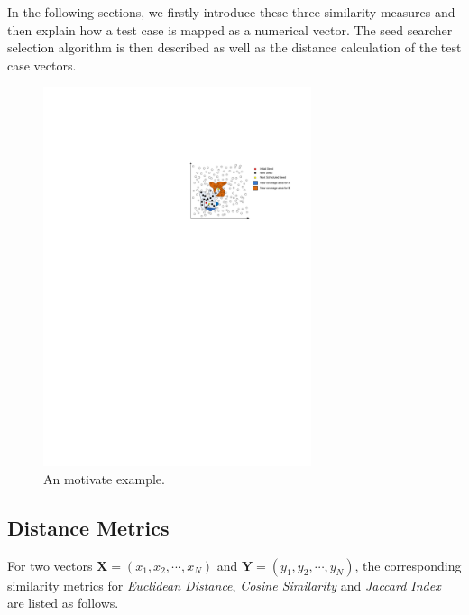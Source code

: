 In the following sections, we firstly introduce these three similarity measures and then explain how a test case is mapped as a numerical vector. The seed searcher selection algorithm is then described as well as the distance calculation of the test case vectors.

\begin{figure}
\centering
\includegraphics[width=0.7\textwidth]{figures/motivate-example.pdf} 
\caption{An motivate example.}\label{motivate-example}
\end{figure}


\subsection{Distance Metrics}
For two vectors $\mathbf{X} = (x_1, x_2, \cdots, x_N)$ and $\mathbf{Y} = (y_1, y_2, \cdots, y_N)$, the corresponding similarity metrics for \textit{Euclidean Distance}, \textit{Cosine Similarity} and \textit{Jaccard Index} are listed as follows.

